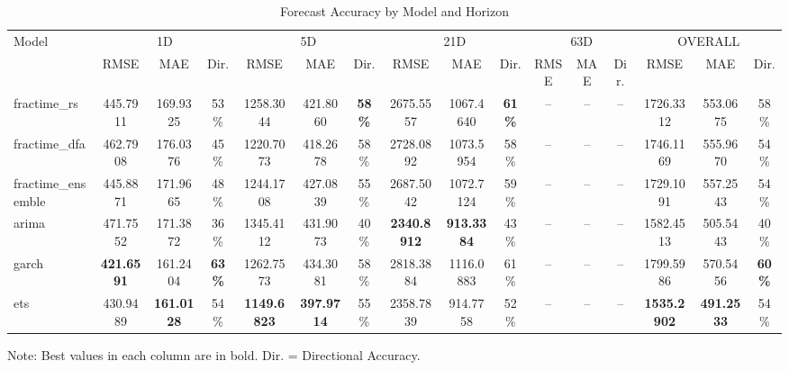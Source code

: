 \begin{table}[htbp]
\centering
\caption{Forecast Accuracy by Model and Horizon}
\label{tab:main_results}
\begin{tabular}{lccccccccccccccc}
\toprule
Model & \multicolumn{3}{c}{1D} & \multicolumn{3}{c}{5D} & \multicolumn{3}{c}{21D} & \multicolumn{3}{c}{63D} & \multicolumn{3}{c}{OVERALL} \\
\cmidrule(lr){2-4}\cmidrule(lr){2-4}\cmidrule(lr){2-4}\cmidrule(lr){2-4}\cmidrule(lr){2-4}
 & RMSE & MAE & Dir. & RMSE & MAE & Dir. & RMSE & MAE & Dir. & RMSE & MAE & Dir. & RMSE & MAE & Dir. \\
\midrule
fractime\_rs & 445.7911 & 169.9325 & 53\% & 1258.3044 & 421.8060 & \textbf{58\%} & 2675.5557 & 1067.4640 & \textbf{61\%} & -- & -- & -- & 1726.3312 & 553.0675 & 58\% \\
fractime\_dfa & 462.7908 & 176.0376 & 45\% & 1220.7073 & 418.2678 & 58\% & 2728.0892 & 1073.5954 & 58\% & -- & -- & -- & 1746.1169 & 555.9670 & 54\% \\
fractime\_ensemble & 445.8871 & 171.9665 & 48\% & 1244.1708 & 427.0839 & 55\% & 2687.5042 & 1072.7124 & 59\% & -- & -- & -- & 1729.1091 & 557.2543 & 54\% \\
arima & 471.7552 & 171.3872 & 36\% & 1345.4112 & 431.9073 & 40\% & \textbf{2340.8912} & \textbf{913.3384} & 43\% & -- & -- & -- & 1582.4513 & 505.5443 & 40\% \\
garch & \textbf{421.6591} & 161.2404 & \textbf{63\%} & 1262.7573 & 434.3081 & 58\% & 2818.3884 & 1116.0883 & 61\% & -- & -- & -- & 1799.5986 & 570.5456 & \textbf{60\%} \\
ets & 430.9489 & \textbf{161.0128} & 54\% & \textbf{1149.6823} & \textbf{397.9714} & 55\% & 2358.7839 & 914.7758 & 52\% & -- & -- & -- & \textbf{1535.2902} & \textbf{491.2533} & 54\% \\
\bottomrule
\end{tabular}
\begin{tablenotes}
\small
\item Note: Best values in each column are in bold. Dir. = Directional Accuracy.
\end{tablenotes}
\end{table}
